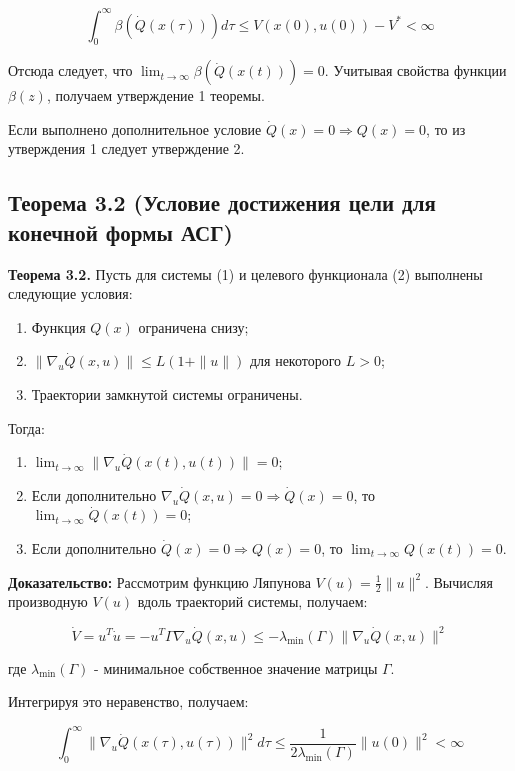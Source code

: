 \documentclass[14pt,a4paper]{article}
\begin{document}
\begin{equation}
    \int_0^\infty \beta(\dot{Q}(x(\tau)))d\tau \leq V(x(0),u(0)) - V^* < \infty
\end{equation}

Отсюда следует, что $\lim_{t \to \infty} \beta(\dot{Q}(x(t))) = 0$. Учитывая свойства функции $\beta(z)$, получаем утверждение 1 теоремы.

Если выполнено дополнительное условие $\dot{Q}(x) = 0 \Rightarrow Q(x) = 0$, то из утверждения 1 следует утверждение 2.

\subsection{Теорема 3.2 (Условие достижения цели для конечной формы АСГ)}
\textbf{Теорема 3.2.} Пусть для системы (1) и целевого функционала (2) выполнены следующие условия:
\begin{enumerate}
    \item Функция $Q(x)$ ограничена снизу;
    \item $\|\nabla_u \dot{Q}(x,u)\| \leq L(1 + \|u\|)$ для некоторого $L > 0$;
    \item Траектории замкнутой системы ограничены.
\end{enumerate}
Тогда:
\begin{enumerate}
    \item $\lim_{t \to \infty} \|\nabla_u \dot{Q}(x(t),u(t))\| = 0$;
    \item Если дополнительно $\nabla_u \dot{Q}(x,u) = 0 \Rightarrow \dot{Q}(x) = 0$, то $\lim_{t \to \infty} \dot{Q}(x(t)) = 0$;
    \item Если дополнительно $\dot{Q}(x) = 0 \Rightarrow Q(x) = 0$, то $\lim_{t \to \infty} Q(x(t)) = 0$.
\end{enumerate}

\textbf{Доказательство:}
Рассмотрим функцию Ляпунова $V(u) = \frac{1}{2}\|u\|^2$. Вычисляя производную $V(u)$ вдоль траекторий системы, получаем:

\begin{equation}
    \dot{V} = u^T \dot{u} = -u^T \Gamma \nabla_u \dot{Q}(x,u) \leq -\lambda_{\min}(\Gamma) \|\nabla_u \dot{Q}(x,u)\|^2
\end{equation}

где $\lambda_{\min}(\Gamma)$ - минимальное собственное значение матрицы $\Gamma$.

Интегрируя это неравенство, получаем:

\begin{equation}
    \int_0^\infty \|\nabla_u \dot{Q}(x(\tau),u(\tau))\|^2 d\tau \leq \frac{1}{2\lambda_{\min}(\Gamma)} \|u(0)\|^2 < \infty
\end{equation}
\end{document}
